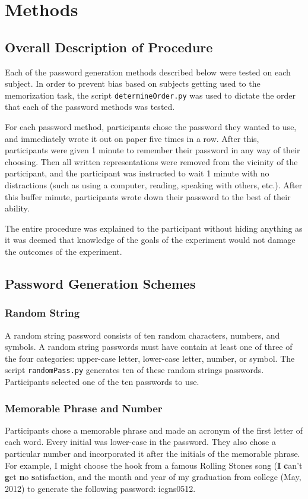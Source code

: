 \documentclass{article}
\begin{document}
\section*{Methods}
\subsection*{Overall Description of Procedure}
Each of the password generation methods described below were tested on each subject. In order to prevent bias based on subjects getting used to the memorization task, the script \texttt{determineOrder.py} was used to dictate the order that each of the password methods was tested.

For each password method, participants chose the password they wanted to use, and immediately wrote it out on paper five times in a row. After this, participants were given 1 minute to remember their password in any way of their choosing. Then all written representations were removed from the vicinity of the participant, and the participant was instructed to wait 1 minute with no distractions (such as using a computer, reading, speaking with others, etc.). After this buffer minute, participants wrote down their password to the best of their ability. 

The entire procedure was explained to the participant without hiding anything as it was deemed that knowledge of the goals of the experiment would not damage the outcomes of the experiment.


\subsection*{Password Generation Schemes}
\subsubsection*{Random String}
A random string password consists of ten random characters, numbers, and symbols. A random string passwords must have contain at least one of three of the four categories: upper-case letter, lower-case letter, number, or symbol. The script \texttt{randomPass.py} generates ten of these random strings passwords. Participants selected one of the ten passwords to use.


\subsubsection*{Memorable Phrase and Number}
Participants chose a memorable phrase and made an acronym of the first letter of each word. Every initial was lower-case in the password. They also chose a particular number and incorporated it after the initials of the memorable phrase. For example, I might choose the hook from a famous Rolling Stones song (\textbf{I} \textbf{c}an't \textbf{g}et \textbf{n}o \textbf{s}atisfaction, and the month and year of my graduation from college (May, 2012) to generate the following password: icgns0512. 
\end{document}
